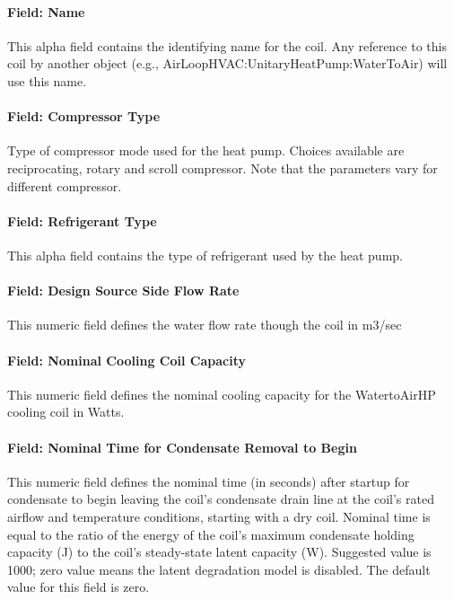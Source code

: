 \paragraph{Field: Name}\label{field-name-28}

This alpha field contains the identifying name for the coil. Any reference to this coil by another object (e.g., AirLoopHVAC:UnitaryHeatPump:WaterToAir) will use this name.

\paragraph{Field: Compressor Type}\label{field-compressor-type}

Type of compressor mode used for the heat pump. Choices available are reciprocating, rotary and scroll compressor. Note that the parameters vary for different compressor.

\paragraph{Field: Refrigerant Type}\label{field-refrigerant-type}

This alpha field contains the type of refrigerant used by the heat pump.

\paragraph{Field: Design Source Side Flow Rate}\label{field-design-source-side-flow-rate}

This numeric field defines the water flow rate though the coil in m3/sec

\paragraph{Field: Nominal Cooling Coil Capacity}\label{field-nominal-cooling-coil-capacity}

This numeric field defines the nominal cooling capacity for the WatertoAirHP cooling coil in Watts.

\paragraph{Field: Nominal Time for Condensate Removal to Begin}\label{field-nominal-time-for-condensate-removal-to-begin-3}

This numeric field defines the nominal time (in seconds) after startup for condensate to begin leaving the coil's condensate drain line at the coil's rated airflow and temperature conditions, starting with a dry coil. Nominal time is equal to the ratio of the energy of the coil's maximum condensate holding capacity (J) to the coil's steady-state latent capacity (W). Suggested value is 1000; zero value means the latent degradation model is disabled. The default value for this field is zero.

